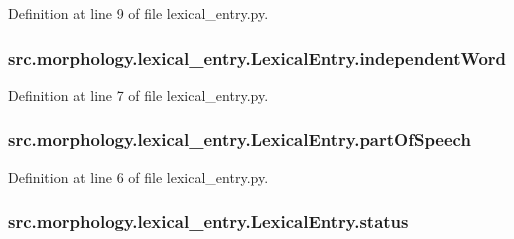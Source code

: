 Definition at line 9 of file lexical\+\_\+entry.\+py.

\hypertarget{classsrc_1_1morphology_1_1lexical__entry_1_1_lexical_entry_a6c28ee96aa864b03c7b7ec1e7a7490cf}{
\subsubsection[{independent\+Word}]{\setlength{\rightskip}{0pt plus 5cm}src.\+morphology.\+lexical\+\_\+entry.\+Lexical\+Entry.\+independent\+Word}}\label{classsrc_1_1morphology_1_1lexical__entry_1_1_lexical_entry_a6c28ee96aa864b03c7b7ec1e7a7490cf}


Definition at line 7 of file lexical\+\_\+entry.\+py.

\hypertarget{classsrc_1_1morphology_1_1lexical__entry_1_1_lexical_entry_adf76c7a533c3ee416d7f78952a0b5921}{
\subsubsection[{part\+Of\+Speech}]{\setlength{\rightskip}{0pt plus 5cm}src.\+morphology.\+lexical\+\_\+entry.\+Lexical\+Entry.\+part\+Of\+Speech}}\label{classsrc_1_1morphology_1_1lexical__entry_1_1_lexical_entry_adf76c7a533c3ee416d7f78952a0b5921}


Definition at line 6 of file lexical\+\_\+entry.\+py.

\hypertarget{classsrc_1_1morphology_1_1lexical__entry_1_1_lexical_entry_a998ec543b526f78f773be3add318e898}{
\subsubsection[{status}]{\setlength{\rightskip}{0pt plus 5cm}src.\+morphology.\+lexical\+\_\+entry.\+Lexical\+Entry.\+status}}\label{classsrc_1_1morphology_1_1lexical__entry_1_1_lexical_entry_a998ec543b526f78f773be3add318e898}


